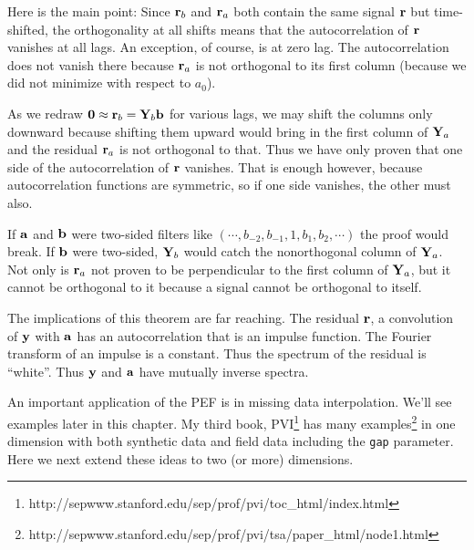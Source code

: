 \par
Here is the main point:
Since $\bold r_b$ and $\bold r_a$ both contain the same signal $\bold r$
but time-shifted,
the orthogonality at all shifts means that the autocorrelation
of $\bold r$
vanishes at all lags.
An exception, of course, is at zero lag.
The autocorrelation does not vanish there
because $\bold r_a$ is not orthogonal to its first column
(because we did not minimize with respect to $a_0$).
\par
As we redraw
$\bold 0\approx\bold r_b =\bold Y_b\bold b$
for various lags,
we may shift the columns only downward
because shifting them upward would bring in the first column
of $\bold Y_a$ and the residual $\bold r_a$ is not orthogonal to that.
Thus we have only proven that
one side of the autocorrelation of $\bold r$ vanishes.
That is enough however, because autocorrelation functions
are symmetric, so if one side vanishes, the other must also.
\par
If $\bold a$ and $\bold b$ were two-sided
filters like $(\cdots ,b_{-2}, b_{-1}, 1, b_1, b_2, \cdots)$
the proof would break.
If $\bold b$ were two-sided, $\bold Y_b$ would catch the 
nonorthogonal column of $\bold Y_a$.
Not only is $\bold r_a$ not proven to be perpendicular
to the first column of $\bold Y_a$,
but it cannot be orthogonal to it
because a signal cannot be orthogonal to itself.
\par
The implications of this theorem are far reaching.
The residual $\bold r$,
a convolution of $\bold y$
with $\bold a$ has an
autocorrelation that is an impulse function.
The Fourier transform of an impulse is a constant.
Thus the spectrum of the residual is ``white''.
Thus $\bold y$ and $\bold a$ have mutually inverse spectra.
\par
{}

\par
An important application of the PEF
is in missing data interpolation.
We'll see examples later in this chapter.
My third book,
PVI\footnote{
	http://sepwww.stanford.edu/sep/prof/pvi/toc\_html/index.html
	}
has many
examples\footnote{
	http://sepwww.stanford.edu/sep/prof/pvi/tsa/paper\_html/node1.html
	}
in one dimension with both synthetic data and field data
including the \texttt{gap} parameter.
Here we next extend these ideas to two (or more) dimensions.



